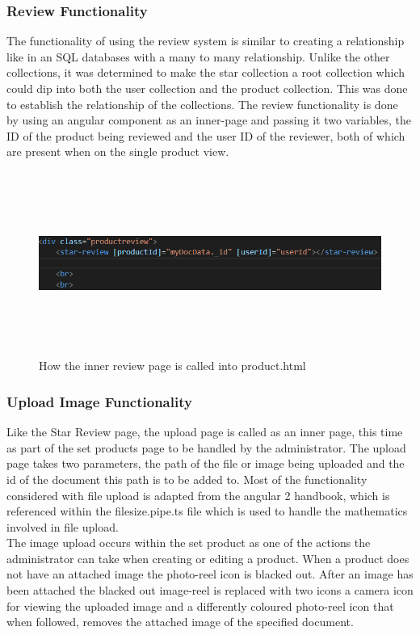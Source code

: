 \subsubsection{Review Functionality}
The functionality of using the review system is similar to creating a relationship like in an SQL databases with a many to many relationship. Unlike the other collections, it was determined to make the star collection a root collection which could dip into both the user collection and the product collection. This was done to establish the relationship of the collections. The review functionality is done by using an angular component as an inner-page and passing it two variables, the ID of the product being reviewed and the user ID of the reviewer, both of which are present when on the single product view. 
\begin{figure}[h!]
    	\caption{How the inner review page is called into product.html}
	\centering
	\includegraphics[width=15cm, height=6cm]{images/reviewcall.png}
\end{figure}


\subsubsection{Upload Image Functionality}
Like the Star Review page, the upload page is called as an inner page, this time as part of the set products page to be handled by the administrator. The upload page takes two parameters, the path of the file or image being uploaded and the id of the document this path is to be added to. Most of the functionality considered with file upload is adapted from the angular 2 handbook, which is referenced within the filesize.pipe.ts file which is used to handle the mathematics involved in file upload.\\ 
The image upload occurs within the set product as one of the actions the administrator can take when creating or editing a product. When a product does not have an attached image the photo-reel icon is blacked out. After an image has been attached the blacked out image-reel is replaced with two icons a camera icon for viewing the uploaded image and a differently coloured photo-reel icon that when followed, removes the attached image of the specified document.

